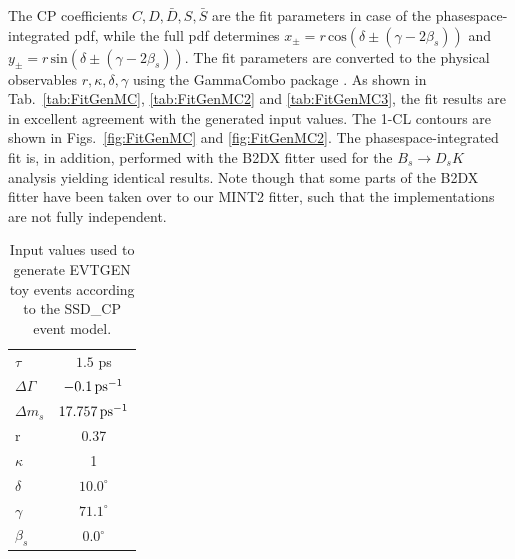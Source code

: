 The CP coefficients $C,D,\bar D,S,\bar S$ are the fit parameters in case of the phasespace-integrated pdf,
while the full pdf determines $x_\pm = r \, \text{cos}(\delta\pm(\gamma-2\beta_s))$ and $y_\pm = r \, \text{sin}(\delta\pm(\gamma-2\beta_s))$.
The fit parameters are converted to the physical observables $r,\kappa,\delta,\gamma$ using the \textsf{GammaCombo} package \cite{GammaCombo}.
As shown in Tab.~\ref{tab:FitGenMC}, \ref{tab:FitGenMC2} and \ref{tab:FitGenMC3}, the fit results are in excellent agreement with the generated input values.
The 1-CL contours are shown in Figs.~\ref{fig:FitGenMC} and \ref{fig:FitGenMC2}.
The phasespace-integrated fit is, in addition, performed with the \textsf{B2DX} fitter used for the $B_s \to D_s K$ analysis yielding identical results.
Note though that some parts of the \textsf{B2DX} fitter have been taken over to our \textsf{MINT2} fitter, such that the implementations are not fully independent.

\begin{table}[h]
\caption{Input values used to generate \textsf{EVTGEN} toy events according to the \textsf{SSD\_CP} event model.} 		
  \centering
  \begin{tabular}
    {l c}
    \hline \hline
    $\tau$  & $1.5$ ps \\   
    $\Delta\Gamma$  & $-0.1 {\mathrm{ \,ps}}^{-1}$ \\   
     $\Delta m_s$  & $17.757 {\mathrm{ \,ps}}^{-1}$ \\   
     r & 0.37\\
     $\kappa$ & 1\\
     $\delta$ & $10.0^\circ$\\
     $\gamma$ & $71.1^\circ$\\
     $\beta_s$ & $0.0^\circ$\\
    \hline \hline
  \end{tabular}
  \label{tab:InputGenMC}
\end{table}

